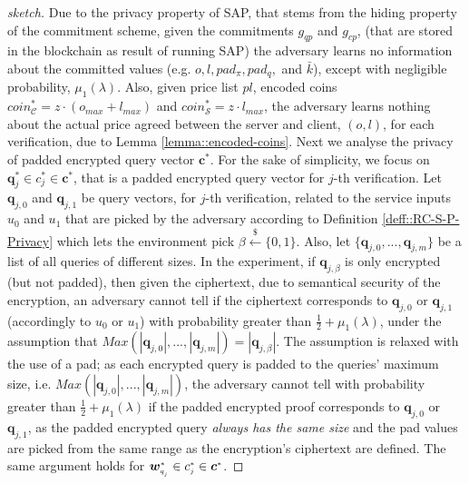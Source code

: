 \begin{proof}[sketch]
Due to the privacy property of SAP, that stems from the  hiding property of the commitment scheme, given the commitments $g_{\scriptscriptstyle qp}$ and $g_{\scriptscriptstyle cp}$, (that are stored in the blockchain as result of running SAP) the adversary learns no information about the committed values (e.g. $o, l, pad_{\scriptscriptstyle\pi}, pad_{\scriptscriptstyle q},$ and $\bar{k}$), except with negligible probability, $\mu_{\scriptscriptstyle 1}(\lambda)$.   Also, given  price list $pl$, encoded coins $coin^{\scriptscriptstyle *}_{\scriptscriptstyle\mathcal{C}}=z\cdot (o_{\scriptscriptstyle max}+l_{\scriptscriptstyle max})$ and  $coin^{\scriptscriptstyle *}_{\scriptscriptstyle\mathcal{S}}=z\cdot l_{\scriptscriptstyle max}$, the adversary learns nothing about the actual price agreed between the server and client,  $(o,l)$, for each verification, due to Lemma \ref{lemma::encoded-coins}. Next we analyse the privacy of padded encrypted query vector $\bm{c}^{\scriptscriptstyle *}$. For  the sake of simplicity, we focus on   $\bm{q}^{\scriptscriptstyle *}_{\scriptscriptstyle j}\in c^{\scriptscriptstyle *}_{\scriptscriptstyle j}\in\bm{c}^{\scriptscriptstyle *}$, that is a padded encrypted query vector for $j$-th verification. Let $\bm{q}_{\scriptscriptstyle j,0}$ and $\bm{q}_{\scriptscriptstyle j,1}$  be query vectors, for $j$-th verification, related to the service inputs $u_{\scriptscriptstyle 0}$ and $u_{\scriptscriptstyle 1}$ that    are picked by the adversary according to  Definition  \ref{deff::RC-S-P-Privacy} which lets  the environment pick $\beta\stackrel{\scriptscriptstyle\$}\leftarrow \{0,1\}$. Also, let $\{\bm{q}_{\scriptscriptstyle j,0},...,\bm{q}_{\scriptscriptstyle j,m}\}$ be a  list of all queries of different sizes. In the experiment, if $\bm{q}_{\scriptscriptstyle j,\beta}$  is only   encrypted (but not padded), then given the ciphertext, due to semantical security of the encryption, an adversary cannot tell if the ciphertext corresponds to $\bm{q}_{\scriptscriptstyle j,0}$ or $\bm{q}_{\scriptscriptstyle j,1}$  (accordingly to $u_{\scriptscriptstyle 0}$ or $u_{\scriptscriptstyle 1}$) with probability greater than $\frac{1}{2}+\mu_{\scriptscriptstyle 1}(\lambda)$,  under the assumption  that $Max(|\bm{q}_{\scriptscriptstyle j,0}|,...,|\bm{q}_{\scriptscriptstyle j,m}|)=|\bm{q}_{\scriptscriptstyle j,\beta}|$. The  assumption is  relaxed with the use of a pad; as each encrypted query is padded  to the queries' maximum size, i.e. $Max(|\bm{q}_{\scriptscriptstyle j,0}|,...,|\bm{q}_{\scriptscriptstyle j,m}|)$, the adversary cannot tell with probability greater than $\frac{1}{2}+\mu_{\scriptscriptstyle 1}(\lambda)$ if the  padded encrypted proof corresponds to  $\bm{q}_{\scriptscriptstyle j,0}$ or $\bm{q}_{\scriptscriptstyle j,1}$, as the padded encrypted query \emph{always has the same size} and the pad values are picked from the same range as the encryption's ciphertext are defined. The same argument holds for $\bm{w}^{\scriptscriptstyle *}_{\scriptscriptstyle q_{_{\scaleto{j}{\size}}}}\in c^{\scriptscriptstyle *}_{\scriptscriptstyle j}\in\bm{c}^{\scriptscriptstyle *}$. 


\end{proof}
